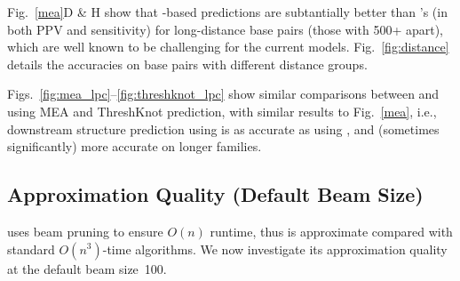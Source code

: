 

Fig.~\ref{mea}D \& H show that \linearpartition-based predictions are subtantially better than \rnafold's (in both PPV and sensitivity) for long-distance base pairs (those with 500+ \nts apart),
which are well known to be challenging for the current models.
Fig.~\ref{fig:distance} details the accuracies on base pairs with different distance groups.


Figs.~\ref{fig:mea_lpc}--\ref{fig:threshknot_lpc} show similar comparisons between 
\contrafold and \linearpartitionc using MEA and ThreshKnot prediction, %
with similar results to Fig.~\ref{mea}, i.e., downstream structure prediction using \linearpartitionc is as accurate as using \contrafold, and  (sometimes significantly) more accurate on longer families.





\vspace{-0.2cm}
\subsection{Approximation Quality (Default Beam Size)}

\linearpartition uses beam pruning to ensure $O(n)$ runtime, %
thus is approximate compared with standard $O(n^3)$-time algorithms.
We now investigate its approximation quality at the default beam size~100.

